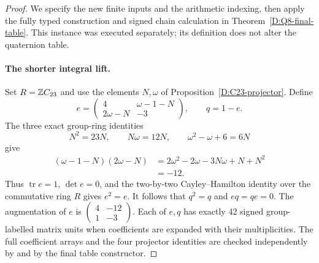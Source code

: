 \begin{proof}
We specify the new finite inputs and the arithmetic indexing, then
apply the fully typed construction and signed chain calculation in
Theorem~\ref{D:Q8-final-table}. This instance was executed separately;
its definition does not alter the quaternion table.

\paragraph{The shorter integral lift.}
Set $R=\mathbb Z C_{23}$ and use the elements $N,\omega$ of
Proposition~\ref{D:C23-projector}. Define
\[
 e=\begin{pmatrix}
 4&\omega-1-N\\
 2\omega-N&-3
 \end{pmatrix},\qquad q=1-e.
\]
The three exact group-ring identities
\[
 N^2=23N,\qquad N\omega=12N,\qquad
 \omega^2-\omega+6=6N
\]
give
\[
\begin{split}
 (\omega-1-N)(2\omega-N)
 &=2\omega^2-2\omega-3N\omega+N+N^2\\
 &=-12.
\end{split}
\]
Thus $\operatorname{tr}e=1$, $\det e=0$, and the two-by-two
Cayley--Hamilton identity over the commutative ring $R$ gives
$e^2=e$. It follows that $q^2=q$ and $eq=qe=0$.
The augmentation of $e$ is
$\left(\begin{smallmatrix}4&-12\\1&-3\end{smallmatrix}\right)$.
Each of $e,q$ has exactly 42 signed group-labelled matrix units
when coefficients are expanded with their multiplicities. The full
coefficient arrays and the four projector identities are checked
independently by  and by the final
table constructor.


\end{proof}
